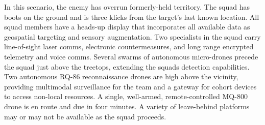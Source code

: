 %
%
%

In this scenario, the enemy has overrun formerly-held territory.
The squad has boots on the ground and is three klicks from the target's last known location.
All squad members have a heads-up display that incorporates all available data as geospatial targeting and sensory augmentation.
Two specialists in the squad carry line-of-sight laser comms, electronic countermeasures, and long range encrypted telemetry and voice comms.
Several swarms of autonomous micro-drones precede the squad just above the treetops, extending the squads detection capabilities.
Two autonomous RQ-86 reconnaissance drones are high above the vicinity, providing multimodal surveillance for the team and a gateway for cohort devices to access non-local resources.
A single, well-armed, remote-controlled MQ-800 drone is en route and due in four minutes.
A variety of leave-behind platforms may or may not be available as the squad proceeds.